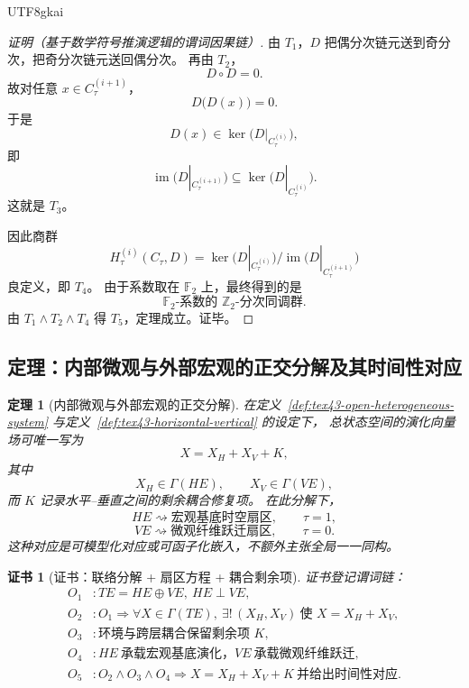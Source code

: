 \documentclass[12pt]{article}
\newtheorem{theorem}{定理}[section]
\newtheorem{Certificate}{证书}[section]
\newcommand{\Ztwo}{\mathbb{Z}_2}
\newcommand{\Ftwo}{\mathbb{F}_2}
\newcommand{\Img}{\operatorname{im}}
\newcommand{\Ker}{\operatorname{ker}}
\begin{document}
\begin{CJK*}{UTF8}{gkai}
\begin{proof}[证明（基于数学符号推演逻辑的谓词因果链）]
由 $T_1$，$D$ 把偶分次链元送到奇分次，把奇分次链元送回偶分次。
再由 $T_2$，
\[
  D\circ D=0.
\]
故对任意 $x\in C_{\tau}^{(i+1)}$，
\[
  D\bigl(D(x)\bigr)=0.
\]
于是
\[
  D(x)\in \Ker\!\bigl(D|_{C_{\tau}^{(i)}}\bigr),
\]
即
\[
  \Img\!\bigl(D|_{C_{\tau}^{(i+1)}}\bigr)\subseteq \Ker\!\bigl(D|_{C_{\tau}^{(i)}}\bigr).
\]
这就是 $T_3$。

因此商群
\[
  H_{\tau}^{(i)}(C_{\tau},D)
  =
  \Ker\!\bigl(D|_{C_{\tau}^{(i)}}\bigr)\Big/\Img\!\bigl(D|_{C_{\tau}^{(i+1)}}\bigr)
\]
良定义，即 $T_4$。
由于系数取在 $\Ftwo$ 上，最终得到的是
\[
  \Ftwo\text{-系数的 }\Ztwo\text{-分次同调群}.
\]
由 $T_1\wedge T_2\wedge T_4$ 得 $T_5$，定理成立。证毕。
\end{proof}

\subsection{定理：内部微观与外部宏观的正交分解及其时间性对应}
\label{subsec:tex43-ch2-theorem-orthogonal}

\begin{theorem}[内部微观与外部宏观的正交分解]
\label{thm:tex43-orthogonal-time}
在定义~\ref{def:tex43-open-heterogeneous-system} 与定义~\ref{def:tex43-horizontal-vertical} 的设定下，
总状态空间的演化向量场可唯一写为
\[
  X=X_H+X_V+K,
\]
其中
\[
  X_H\in \Gamma(HE),
  \qquad
  X_V\in \Gamma(VE),
\]
而 $K$ 记录水平--垂直之间的剩余耦合修复项。
在此分解下，
\[
  HE\rightsquigarrow \text{宏观基底时空扇区},\qquad \tau=1,
\]
\[
  VE\rightsquigarrow \text{微观纤维跃迁扇区},\qquad \tau=0.
\]
这种对应是可模型化对应或可函子化嵌入，不额外主张全局一一同构。
\end{theorem}

\begin{Certificate}[证书：联络分解 + 扇区方程 + 耦合剩余项]
\label{cert:tex43-orthogonal-time}
证书登记谓词链：
\[
\begin{aligned}
  O_1 &: TE=HE\oplus VE,\ HE\perp VE,\\
  O_2 &: O_1 \Rightarrow \forall X\in\Gamma(TE),\ \exists!\,(X_H,X_V)\ \text{使 }X=X_H+X_V,\\
  O_3 &: \text{环境与跨层耦合保留剩余项 }K,\\
  O_4 &: HE\ \text{承载宏观基底演化，}VE\ \text{承载微观纤维跃迁},\\
  O_5 &: O_2\wedge O_3\wedge O_4 \Rightarrow X=X_H+X_V+K\ \text{并给出时间性对应}.
\end{aligned}
\]
\end{Certificate}


\end{CJK*}
\end{document}
